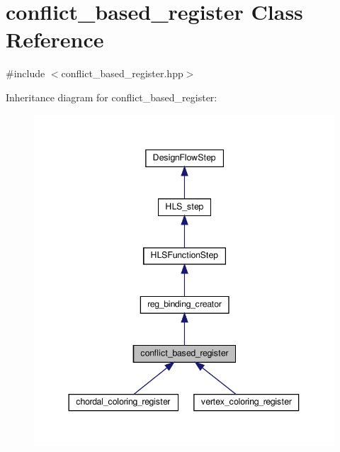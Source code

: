\hypertarget{classconflict__based__register}{}\section{conflict\+\_\+based\+\_\+register Class Reference}
\label{classconflict__based__register}


{\ttfamily \#include $<$conflict\+\_\+based\+\_\+register.\+hpp$>$}



Inheritance diagram for conflict\+\_\+based\+\_\+register\+:
\nopagebreak
\begin{figure}[H]
\begin{center}
\leavevmode
\includegraphics[width=344pt]{da/d8d/classconflict__based__register__inherit__graph}
\end{center}
\end{figure}


